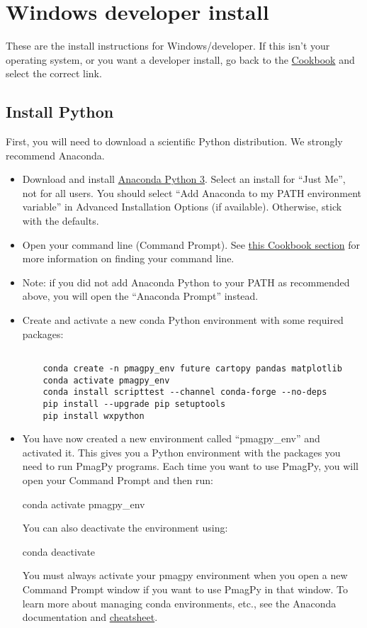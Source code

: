 \documentclass[11pt]{article}
\begin{document}
\tableofcontents


\section{Windows developer install}

These are the install instructions for Windows/developer.  If this isn't your operating system, or you want a developer install, go back to the \href{https://earthref.org/PmagPy/cookbook/#next_steps}{Cookbook} and select the correct link.


\subsection{Install Python}

First, you will need to download a scientific Python distribution.  We strongly recommend Anaconda.

   \begin{itemize}
   \item Download and install \href{https://www.anaconda.com/download}{Anaconda Python 3}.  Select an install for “Just Me”, not for all users.  You should select ``Add Anaconda to my PATH environment variable'' in Advanced Installation Options (if available).  Otherwise, stick with the defaults.
   \item Open your command line (Command Prompt). See \href{https://earthref.org/PmagPy/cookbook/#command_line}{this Cookbook section} for more information on finding your command line.
   \item Note: if you did not add Anaconda Python to your PATH as recommended above, you will open the ``Anaconda Prompt'' instead.
   \item Create and activate a new conda Python environment with some required packages: \begin{verbatim}

    conda create -n pmagpy_env future cartopy pandas matplotlib
    conda activate pmagpy_env
    conda install scripttest --channel conda-forge --no-deps
    pip install --upgrade pip setuptools
    pip install wxpython 
\end{verbatim}
   \item You have now created a new environment called ``pmagpy_env'' and activated it.  This gives you a Python environment with the packages you need to run PmagPy programs.  Each time you want to use PmagPy, you will open your Command Prompt and then run:

     conda activate pmagpy_env

     You can also deactivate the environment using:

     conda deactivate

     You must always activate your pmagpy environment when you open a new Command Prompt window if you want to use PmagPy in that window.  To learn more about managing conda environments, etc., see the Anaconda documentation and \href{https://docs.anaconda.com/anaconda/user-guide/cheatsheet/}{cheatsheet}.

\end{itemize}
\end{document}
